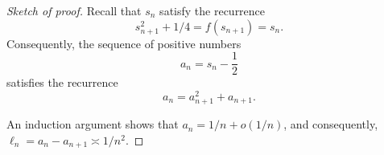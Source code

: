 \begin{proof}[Sketch of proof] Recall that $s_n$ satisfy the recurrence
\begin{equation}
s_{n+1}^2 + 1/4 =f(s_{n+1})= s_n.
\end{equation}
Consequently, 
the sequence of positive numbers
$$
a_n = s_n-\frac{1}{2}
$$
satisfies the recurrence 
\begin{equation}
a_n = a_{n+1}^2+a_{n+1}.
\end{equation}

An induction argument shows that $a_n = 1/n + o(1/n)$, and consequently, $\ell_n = a_n - a_{n+1} \asymp 1/n^2$.




\end{proof}



